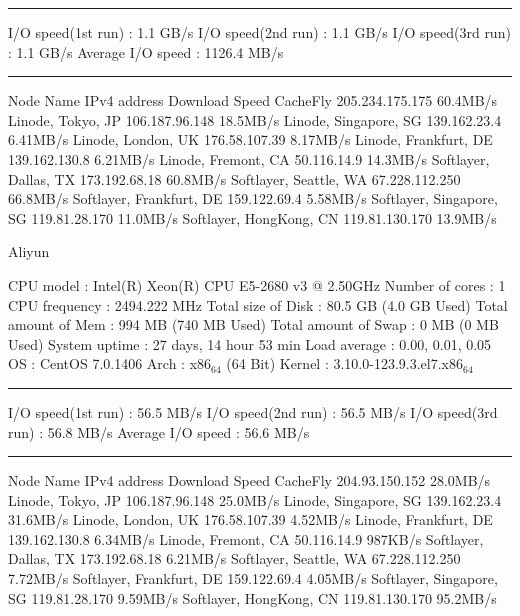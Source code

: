 \documentclass[11pt]{article}
\begin{document}
\noindent\rule{\textwidth}{0.5pt}
I/O speed(1st run)   : 1.1 GB/s
I/O speed(2nd run)   : 1.1 GB/s
I/O speed(3rd run)   : 1.1 GB/s
Average I/O speed    : 1126.4 MB/s

\noindent\rule{\textwidth}{0.5pt}
Node Name                       IPv4 address            Download Speed
CacheFly                        205.234.175.175         60.4MB/s
Linode, Tokyo, JP               106.187.96.148          18.5MB/s
Linode, Singapore, SG           139.162.23.4            6.41MB/s
Linode, London, UK              176.58.107.39           8.17MB/s
Linode, Frankfurt, DE           139.162.130.8           6.21MB/s
Linode, Fremont, CA             50.116.14.9             14.3MB/s
Softlayer, Dallas, TX           173.192.68.18           60.8MB/s
Softlayer, Seattle, WA          67.228.112.250          66.8MB/s
Softlayer, Frankfurt, DE        159.122.69.4            5.58MB/s
Softlayer, Singapore, SG        119.81.28.170           11.0MB/s
Softlayer, HongKong, CN         119.81.130.170          13.9MB/s

Aliyun

CPU model            : Intel(R) Xeon(R) CPU E5-2680 v3 @ 2.50GHz
Number of cores      : 1
CPU frequency        : 2494.222 MHz
Total size of Disk   : 80.5 GB (4.0 GB Used)
Total amount of Mem  : 994 MB (740 MB Used)
Total amount of Swap : 0 MB (0 MB Used)
System uptime        : 27 days, 14 hour 53 min
Load average         : 0.00, 0.01, 0.05
OS                   : CentOS 7.0.1406
Arch                 : x86\(_{\text{64}}\) (64 Bit)
Kernel               : 3.10.0-123.9.3.el7.x86\(_{\text{64}}\)

\noindent\rule{\textwidth}{0.5pt}
I/O speed(1st run)   : 56.5 MB/s
I/O speed(2nd run)   : 56.5 MB/s
I/O speed(3rd run)   : 56.8 MB/s
Average I/O speed    : 56.6 MB/s

\noindent\rule{\textwidth}{0.5pt}
Node Name                       IPv4 address            Download Speed
CacheFly                        204.93.150.152          28.0MB/s
Linode, Tokyo, JP               106.187.96.148          25.0MB/s
Linode, Singapore, SG           139.162.23.4            31.6MB/s
Linode, London, UK              176.58.107.39           4.52MB/s
Linode, Frankfurt, DE           139.162.130.8           6.34MB/s
Linode, Fremont, CA             50.116.14.9             987KB/s
Softlayer, Dallas, TX           173.192.68.18           6.21MB/s
Softlayer, Seattle, WA          67.228.112.250          7.72MB/s
Softlayer, Frankfurt, DE        159.122.69.4            4.05MB/s
Softlayer, Singapore, SG        119.81.28.170           9.59MB/s
Softlayer, HongKong, CN         119.81.130.170          95.2MB/s
\end{document}
